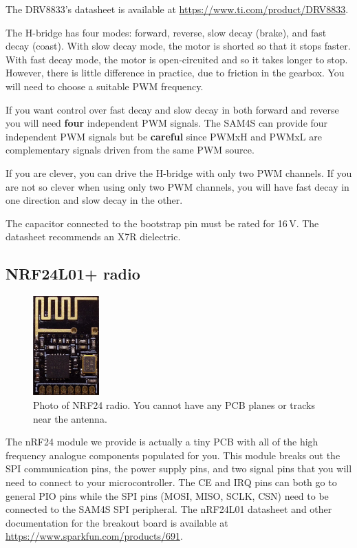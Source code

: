 The DRV8833's datasheet is available at
\url{https://www.ti.com/product/DRV8833}.

The H-bridge has four modes: forward, reverse, slow decay (brake), and
fast decay (coast).  With slow decay mode, the motor is shorted so
that it stops faster.  With fast decay mode, the motor is
open-circuited and so it takes longer to stop.  However, there is
little difference in practice, due to friction in the gearbox.  You will need to choose a suitable PWM frequency.

If you want control over fast decay and slow decay in both forward and
reverse you will need \textbf{four} independent PWM signals. The SAM4S
can provide four independent PWM signals but be \textbf{careful} since
PWMxH and PWMxL are complementary signals driven from the same PWM
source.

If you are clever, you can drive the H-bridge with only two PWM
channels.  If you are not so clever when using only two PWM channels,
you will have fast decay in one direction and slow decay in the other.

The capacitor connected to the bootstrap pin must be rated for
16\,V. The datasheet recommends an X7R dielectric.

\subsection{NRF24L01+ radio}

\begin{figure}[!h]
  \centering \includegraphics[width=1in]{figs/nrf24.jpg}
  \caption{Photo of NRF24 radio.  You cannot have any PCB planes or
    tracks near the antenna.}
  \label{fig:nrf24}
\end{figure}

The nRF24 module we provide is actually a tiny PCB with all of the high
frequency analogue components populated for you. This module breaks out
the SPI communication pins, the power supply pins, and two signal pins
that you will need to connect to your microcontroller. The CE and IRQ
pins can both go to general PIO pins while the SPI pins (MOSI, MISO,
SCLK, CSN) need to be connected to the SAM4S SPI peripheral. The
nRF24L01 datasheet and other documentation for the breakout board is
available at \url{https://www.sparkfun.com/products/691}.

